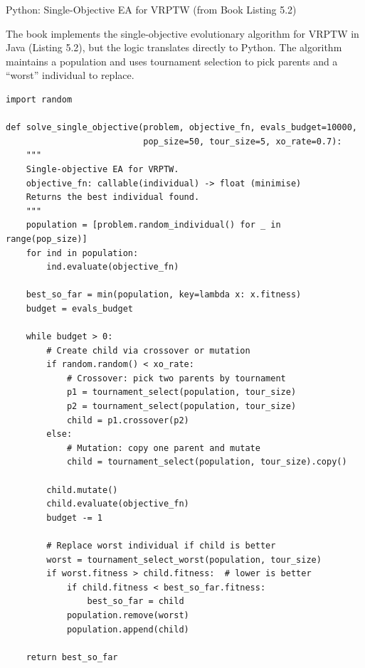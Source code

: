 \documentclass[aspectratio=169,10pt]{beamer}
\begin{document}
\begin{frame}[fragile]{Python: Single-Objective EA for VRPTW (from Book Listing 5.2)}

  The book implements the single-objective evolutionary algorithm for VRPTW in
  Java (Listing 5.2), but the logic translates directly to Python.  The algorithm
  maintains a population and uses tournament selection to pick parents and
  a ``worst'' individual to replace.

\begin{lstlisting}[caption={Single-Objective EA Main Loop (Java $\to$ Python translation)}]
import random

def solve_single_objective(problem, objective_fn, evals_budget=10000,
                           pop_size=50, tour_size=5, xo_rate=0.7):
    """
    Single-objective EA for VRPTW.
    objective_fn: callable(individual) -> float (minimise)
    Returns the best individual found.
    """
    population = [problem.random_individual() for _ in range(pop_size)]
    for ind in population:
        ind.evaluate(objective_fn)

    best_so_far = min(population, key=lambda x: x.fitness)
    budget = evals_budget

    while budget > 0:
        # Create child via crossover or mutation
        if random.random() < xo_rate:
            # Crossover: pick two parents by tournament
            p1 = tournament_select(population, tour_size)
            p2 = tournament_select(population, tour_size)
            child = p1.crossover(p2)
        else:
            # Mutation: copy one parent and mutate
            child = tournament_select(population, tour_size).copy()

        child.mutate()
        child.evaluate(objective_fn)
        budget -= 1

        # Replace worst individual if child is better
        worst = tournament_select_worst(population, tour_size)
        if worst.fitness > child.fitness:  # lower is better
            if child.fitness < best_so_far.fitness:
                best_so_far = child
            population.remove(worst)
            population.append(child)

    return best_so_far
\end{lstlisting}

\end{frame}
\end{document}

